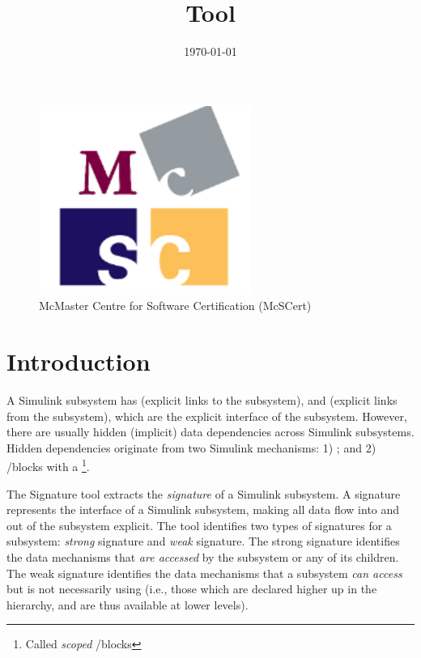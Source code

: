\documentclass{article}
\title{\ToolName Tool}
\date{\monthyeardate\today}
\makeatletter
\newcommand{\ToolName}{Signature\@\xspace}
\makeatother
\begin{document}
\maketitle
\vfill

\begin{figure}
	\centering
	\includegraphics[]{../figs/McSCert_Logo.pdf} \\
	McMaster Centre for Software Certification (McSCert)
\end{figure}

\newpage

\tableofcontents
\newpage

\section{Introduction}

A Simulink subsystem has  (explicit links to the subsystem), and  (explicit links from the subsystem), which are the explicit interface of the subsystem. However, there are usually hidden (implicit) data dependencies across Simulink subsystems. Hidden dependencies originate from two Simulink mechanisms: 1) \DSM; and 2) \goto/\from blocks with a \footnote{Called \emph{scoped} \goto/\from blocks}. 

The \ToolName tool extracts the \emph{signature} of a Simulink subsystem. A signature represents the interface of a Simulink subsystem, making all data flow into and out of the subsystem explicit. The tool identifies two types of signatures for a subsystem: \emph{strong} signature and \emph{weak} signature. The strong signature identifies the data mechanisms that \emph{are accessed} by the subsystem or any of its children. The weak signature identifies the data mechanisms that a subsystem \emph{can access} but is not necessarily using (i.e., those which are declared higher up in the hierarchy, and are thus available at lower levels). 
\end{document}
